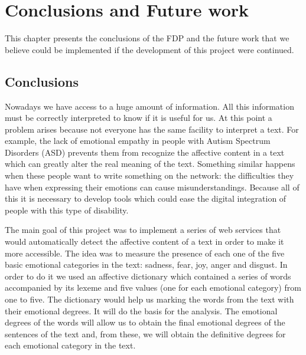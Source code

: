 %
%
\setlength{\parskip}{10pt}
\chapter{Conclusions and Future work}

\begin{resumen}
This chapter presents the conclusions of the FDP and the future work that we believe could be implemented if the development of this project were continued.
\end{resumen}

\section{Conclusions}
\label{cap12:sec:conclusiones}

Nowadays we have access to a huge amount of information. All this information must be correctly interpreted to know if it is useful for us. At this point a problem arises because not everyone has the same facility to interpret a text. For example, the lack of emotional empathy in people with Autism Spectrum Disorders (ASD) prevents them from recognize the affective content in a text which can greatly alter the real meaning of the text. Something similar happens when these people want to write something on the network: the difficulties they have when expressing their emotions can cause misunderstandings. Because all of this it is necessary to develop tools which could ease the digital integration of people with this type of disability.

The main goal of this project was to implement a series of web services that would automatically detect the affective content of a text in order to make it more accessible. The idea was to measure the presence of each one of the five basic emotional categories in the text: sadness, fear, joy, anger and disgust. In order to do it we used an affective dictionary which contained a series of words accompanied by its lexeme and five values (one for each emotional category) from one to five. The dictionary would help us marking the words from the text with their emotional degrees. It will do the basis for the analysis. The emotional degrees of the words will allow us to obtain the final emotional degrees of the sentences of the text and, from these, we will obtain the definitive degrees for each emotional category in the text.

